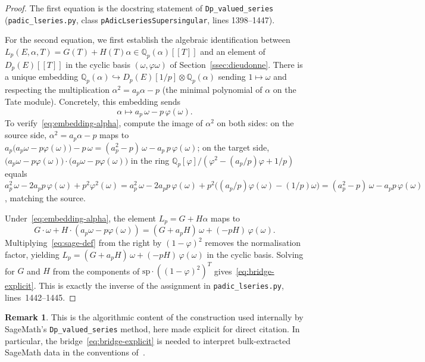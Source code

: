 \documentclass[11pt,a4paper]{amsart}
\theoremstyle{definition}
\newtheorem{remark}[theorem]{Remark}
\newcommand{\Qp}{\mathbb{Q}_p}
\begin{document}
\begin{proof}
The first equation is the docstring statement of \texttt{Dp\_valued\_series} (\texttt{padic\_lseries.py}, class \texttt{pAdicLseriesSupersingular}, lines 1398--1447).

For the second equation, we first establish the algebraic identification between $L_p(E, \alpha, T) = G(T) + H(T)\alpha \in \Qp(\alpha)[\![T]\!]$ and an element of $D_p(E)[\![T]\!]$ in the cyclic basis $(\omega, \varphi\omega)$ of Section~\ref{ssec:dieudonne}. There is a unique embedding $\Qp(\alpha) \hookrightarrow D_p(E)[1/p] \otimes \Qp(\alpha)$ sending $1 \mapsto \omega$ and respecting the multiplication $\alpha^2 = a_p\alpha - p$ (the minimal polynomial of $\alpha$ on the Tate module). Concretely, this embedding sends
\begin{equation}\label{eq:embedding-alpha}
\alpha \longmapsto a_p\,\omega - p\,\varphi(\omega).
\end{equation}
To verify~\eqref{eq:embedding-alpha}, compute the image of $\alpha^2$ on both sides: on the source side, $\alpha^2 = a_p\alpha - p$ maps to $a_p\bigl(a_p\omega - p\varphi(\omega)\bigr) - p\,\omega = (a_p^2 - p)\,\omega - a_p\,p\,\varphi(\omega)$; on the target side, $\bigl(a_p\omega - p\varphi(\omega)\bigr)\cdot\bigl(a_p\omega - p\varphi(\omega)\bigr)$ in the ring $\Qp[\varphi]/(\varphi^2 - (a_p/p)\varphi + 1/p)$ equals $a_p^2\,\omega - 2 a_p p\,\varphi(\omega) + p^2\varphi^2(\omega) = a_p^2\,\omega - 2 a_p p\,\varphi(\omega) + p^2\bigl((a_p/p)\varphi(\omega) - (1/p)\omega\bigr) = (a_p^2 - p)\,\omega - a_p p\,\varphi(\omega)$, matching the source.

Under~\eqref{eq:embedding-alpha}, the element $L_p = G + H\alpha$ maps to
\[
G\cdot\omega + H\cdot(a_p\omega - p\varphi(\omega)) = (G + a_p H)\,\omega + (-pH)\,\varphi(\omega).
\]
Multiplying~\eqref{eq:sage-def} from the right by $(1-\varphi)^2$ removes the normalisation factor, yielding $L_p = (G + a_p H)\,\omega + (-pH)\,\varphi(\omega)$ in the cyclic basis. Solving for $G$ and $H$ from the components of $\text{sp} \cdot ((1-\varphi)^2)^T$ gives~\eqref{eq:bridge-explicit}. This is exactly the inverse of the assignment in \texttt{padic\_lseries.py}, lines~1442--1445.
\end{proof}

\begin{remark}
This is the algorithmic content of the construction used internally by SageMath's \texttt{Dp\_valued\_series} method, here made explicit for direct citation. In particular, the bridge~\eqref{eq:bridge-explicit} is needed to interpret bulk-extracted SageMath data in the conventions of~\cite{Sprung2012, Sprung2016}.
\end{remark}
\end{document}
